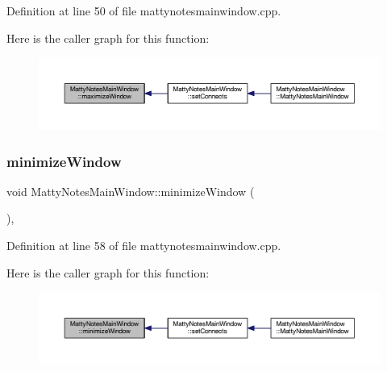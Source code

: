 Definition at line 50 of file mattynotesmainwindow.\+cpp.

Here is the caller graph for this function\+:
\nopagebreak
\begin{figure}[H]
\begin{center}
\leavevmode
\includegraphics[width=350pt]{classMattyNotesMainWindow_aa04cca9a2d55f2f1625bd18892a8814a_icgraph}
\end{center}
\end{figure}
\hypertarget{classMattyNotesMainWindow_a91131115f70c09c62b50bf71bc4b0d73}{}\label{classMattyNotesMainWindow_a91131115f70c09c62b50bf71bc4b0d73} 
\subsubsection{\texorpdfstring{minimize\+Window}{minimizeWindow}}
{\footnotesize\ttfamily void Matty\+Notes\+Main\+Window\+::minimize\+Window (\begin{DoxyParamCaption}{ }\end{DoxyParamCaption})\hspace{0.3cm}{\ttfamily [private]}, {\ttfamily [slot]}}



Definition at line 58 of file mattynotesmainwindow.\+cpp.

Here is the caller graph for this function\+:
\nopagebreak
\begin{figure}[H]
\begin{center}
\leavevmode
\includegraphics[width=350pt]{classMattyNotesMainWindow_a91131115f70c09c62b50bf71bc4b0d73_icgraph}
\end{center}
\end{figure}
\hypertarget{classMattyNotesMainWindow_a83425b00e2b3bdbe213535894b11cc3a}{}\label{classMattyNotesMainWindow_a83425b00e2b3bdbe213535894b11cc3a} 
